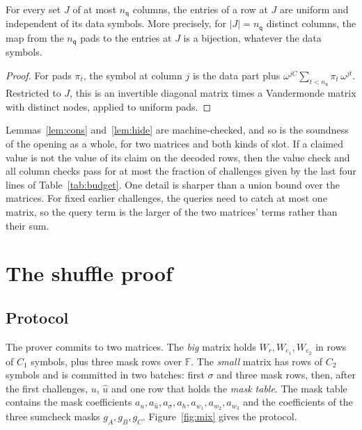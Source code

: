 \documentclass[sigconf,anonymous]{acmart}
\newcommand{\F}{\mathbb{F}}
\newcommand{\nq}{n_{\mathsf{q}}}
\newcommand{\uh}{\hat{u}}
\begin{document}
\begin{lemma}[Hiding]\label{lem:hide}
For every set $J$ of at most $\nq$ columns, the entries of a row at $J$ are uniform and independent
of its data symbols. More precisely, for $|J|=\nq$ distinct columns, the map from the $\nq$ pads to
the entries at $J$ is a bijection, whatever the data symbols.
\end{lemma}
\begin{proof}
For pads $\pi_t$, the symbol at column $j$ is the data part plus
$\omega^{jC}\sum_{t<\nq}\pi_t\,\omega^{jt}$. Restricted to $J$, this is an invertible diagonal matrix
times a Vandermonde matrix with distinct nodes, applied to uniform pads.
\end{proof}

Lemmas~\ref{lem:cons} and~\ref{lem:hide} are machine-checked, and so is the soundness of the
opening as a whole, for two matrices and both kinds of slot. If a claimed value is not the value of
its claim on the decoded rows, then the value check and all column checks pass for at most the
fraction of challenges given by the last four lines of Table~\ref{tab:budget}. One detail is sharper
than a union bound over the matrices. For fixed earlier challenges, the queries need to catch at
most one matrix, so the query term is the larger of the two matrices' terms rather than their sum.

\section{The shuffle proof}
\label{sec:shuffle}

\subsection{Protocol}

The prover commits to two matrices. The \emph{big} matrix holds $W_r,W_{e_1},W_{e_2}$ in rows of
$C_1$ symbols, plus three mask rows over $\F$. The \emph{small} matrix has rows of $C_2$ symbols and
is committed in two batches: first $\sigma$ and three mask rows, then, after the first challenges,
$u$, $\uh$ and one row that holds the \emph{mask table}. The mask table contains the mask
coefficients $a_u,a_{\uh},a_\sigma,a_h,a_{w_1},a_{w_2},a_{w_3}$ and the coefficients of the three
sumcheck masks $g_A,g_B,g_C$. Figure~\ref{fig:mix} gives the protocol.
\end{document}
